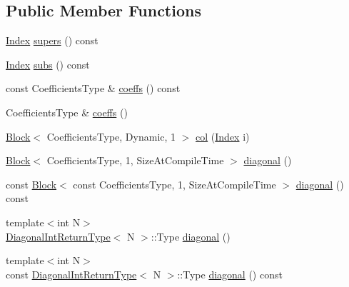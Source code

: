 \subsection*{Public Member Functions}
\begin{DoxyCompactItemize}
\item 
\mbox{\hyperlink{struct_eigen_1_1_eigen_base_a554f30542cc2316add4b1ea0a492ff02}{Index}} \mbox{\hyperlink{class_eigen_1_1internal_1_1_band_matrix_base_a58617da0d75d22b1f8dfdfde702ebb4a}{supers}} () const
\item 
\mbox{\hyperlink{struct_eigen_1_1_eigen_base_a554f30542cc2316add4b1ea0a492ff02}{Index}} \mbox{\hyperlink{class_eigen_1_1internal_1_1_band_matrix_base_a1115fe9b5a07d5218dacc15655a413cb}{subs}} () const
\item 
const Coefficients\+Type \& \mbox{\hyperlink{class_eigen_1_1internal_1_1_band_matrix_base_ab7c9e9a7ca5ad0f2f3a82ac582650499}{coeffs}} () const
\item 
Coefficients\+Type \& \mbox{\hyperlink{class_eigen_1_1internal_1_1_band_matrix_base_ab296a77fa3ac9c7618957b01c7de0a35}{coeffs}} ()
\item 
\mbox{\hyperlink{class_eigen_1_1_block}{Block}}$<$ Coefficients\+Type, Dynamic, 1 $>$ \mbox{\hyperlink{class_eigen_1_1internal_1_1_band_matrix_base_aca78a4990b6827b0b3086e28e6ae4257}{col}} (\mbox{\hyperlink{struct_eigen_1_1_eigen_base_a554f30542cc2316add4b1ea0a492ff02}{Index}} i)
\item 
\mbox{\hyperlink{class_eigen_1_1_block}{Block}}$<$ Coefficients\+Type, 1, Size\+At\+Compile\+Time $>$ \mbox{\hyperlink{class_eigen_1_1internal_1_1_band_matrix_base_abce1c4d69e72ec594f67a841d1040606}{diagonal}} ()
\item 
const \mbox{\hyperlink{class_eigen_1_1_block}{Block}}$<$ const Coefficients\+Type, 1, Size\+At\+Compile\+Time $>$ \mbox{\hyperlink{class_eigen_1_1internal_1_1_band_matrix_base_a7c55438da88b00d29f8f514bddfa86ba}{diagonal}} () const
\item 
{\footnotesize template$<$int N$>$ }\\\mbox{\hyperlink{struct_eigen_1_1internal_1_1_band_matrix_base_1_1_diagonal_int_return_type}{Diagonal\+Int\+Return\+Type}}$<$ N $>$\+::Type \mbox{\hyperlink{class_eigen_1_1internal_1_1_band_matrix_base_a1d98143681d5c1e2709ce18332a939dc}{diagonal}} ()
\item 
{\footnotesize template$<$int N$>$ }\\const \mbox{\hyperlink{struct_eigen_1_1internal_1_1_band_matrix_base_1_1_diagonal_int_return_type}{Diagonal\+Int\+Return\+Type}}$<$ N $>$\+::Type \mbox{\hyperlink{class_eigen_1_1internal_1_1_band_matrix_base_aa8a5c997afb4ebd9b43b9ff2e1078cf9}{diagonal}} () const

\end{DoxyCompactItemize}
